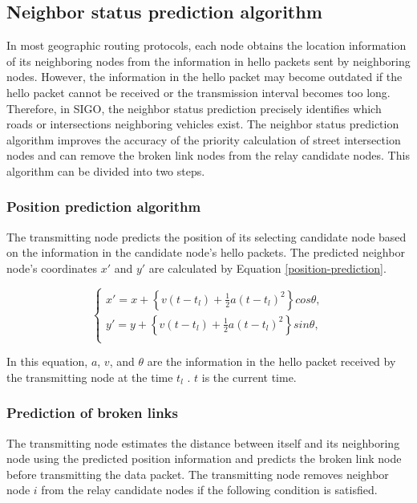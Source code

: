 \documentclass[conference]{IEEEtran}
\begin{document}
\subsection{Neighbor status prediction algorithm}
\label{neighbor_status}
In most geographic routing protocols, each node obtains the location information of its neighboring nodes from the  information in hello packets sent by neighboring nodes.
However, the information in the hello packet may become outdated if the hello packet cannot be received or the transmission interval becomes too long.
Therefore, in SIGO, the neighbor status prediction precisely identifies which roads or intersections neighboring vehicles exist. 
The neighbor status prediction algorithm improves the accuracy of the priority calculation of street intersection nodes and can remove the broken link nodes from the relay candidate nodes. This algorithm can be divided into two steps.
\subsubsection{Position prediction algorithm}

The transmitting node predicts the position of its selecting candidate  node based on the information in the candidate node's hello
packets. 
The predicted neighbor node's coordinates $x'$ and $y'$ are calculated by Equation \ref{position-prediction}.

\begin{equation}
\label{position-prediction}
\begin{cases}
x' = x + \left\{v(t-t_l) + \frac{1}{2}a(t-t_l)^2\right\}cos\theta, \\
y' = y + \left\{v(t-t_l) + \frac{1}{2}a(t-t_l)^2\right\}sin\theta, \\
\end{cases}
\end{equation}

In this equation, $a$, $v$, and $\theta$ are the information in the hello packet received by the transmitting node at the time $t_l$ . $t$ is the current time.

\subsubsection{Prediction of broken links}
The transmitting node estimates the distance between itself and its neighboring node using the predicted position information and predicts the broken link node before transmitting the data packet. The transmitting node removes neighbor node $i$ from the relay candidate nodes if the following condition is satisfied.
\end{document}
